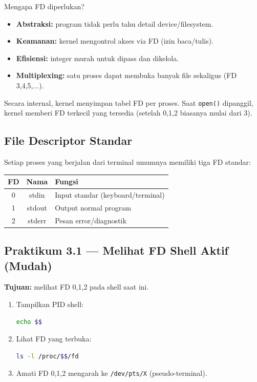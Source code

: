 Mengapa FD diperlukan?
\begin{itemize}
    \item \textbf{Abstraksi:} program tidak perlu tahu detail device/filesystem.
    \item \textbf{Keamanan:} kernel mengontrol akses via FD (izin baca/tulis).
    \item \textbf{Efisiensi:} integer murah untuk dipass dan dikelola.
    \item \textbf{Multiplexing:} satu proses dapat membuka banyak file sekaligus (FD 3,4,5,...).
\end{itemize}

\begin{notebox}
Secara internal, kernel menyimpan tabel FD per proses.
Saat \texttt{open()} dipanggil, kernel memberi FD terkecil yang tersedia (setelah 0,1,2 biasanya mulai dari 3).
\end{notebox}

\subsection*{File Descriptor Standar}
Setiap proses yang berjalan dari terminal umumnya memiliki tiga FD standar:

\begin{center}
\begin{tabular}{|c|c|l|}
\hline
FD & Nama & Fungsi \\
\hline
0 & stdin  & Input standar (keyboard/terminal) \\
1 & stdout & Output normal program \\
2 & stderr & Pesan error/diagnostik \\
\hline
\end{tabular}
\end{center}

\subsection*{Praktikum 3.1 --- Melihat FD Shell Aktif (Mudah)}
\textbf{Tujuan:} melihat FD 0,1,2 pada shell saat ini.

\begin{enumerate}
    \item Tampilkan PID shell:
\begin{lstlisting}[language=bash, caption={PID shell}]
echo $$
\end{lstlisting}

    \item Lihat FD yang terbuka:
\begin{lstlisting}[language=bash, caption={FD shell pada /proc}]
ls -l /proc/$$/fd
\end{lstlisting}

    \item Amati FD 0,1,2 mengarah ke \texttt{/dev/pts/X} (pseudo-terminal).
\end{enumerate}

